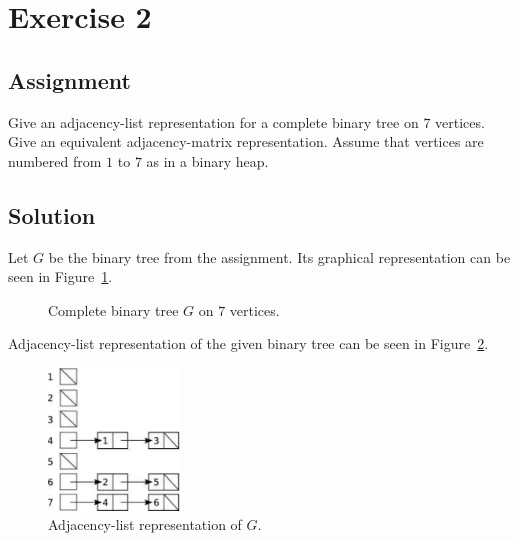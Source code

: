 
\section*{Exercise 2}
\label{sec:Ex2}

\subsection*{Assignment}

Give an adjacency-list representation for a complete binary tree on $7$
vertices. Give an equivalent adjacency-matrix representation. Assume that
vertices are numbered from $1$ to $7$ as in a binary heap.

\subsection*{Solution}

Let $G$ be the binary tree from the assignment. Its graphical representation
can be seen in Figure~\ref{fig:Ex2-BinTree}.

\begin{figure}[h]
	\begin{center}
		\SetUpEdge[style={->}]
	\end{center}
	\caption{Complete binary tree $G$ on $7$ vertices.}
	\label{fig:Ex2-BinTree}
\end{figure}

Adjacency-list representation of the given binary tree can be seen in
Figure~\ref{fig:Ex2-AdjListRep}.

\begin{figure}[h]
	\begin{center}
		\includegraphics[width=3.5cm,keepaspectratio]{include/ex2-adj-list}
	\end{center}
	\caption{Adjacency-list representation of $G$.}
	\label{fig:Ex2-AdjListRep}
\end{figure}

